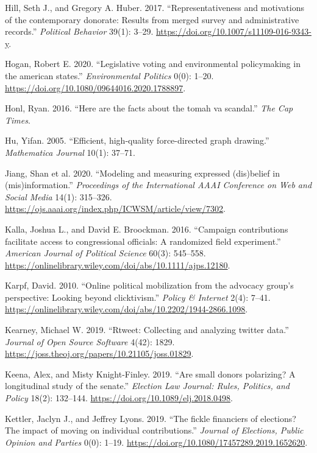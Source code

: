 \documentclass[12pt,]{article}
\begin{document}
\leavevmode\hypertarget{ref-hill2017}{}%
Hill, Seth J., and Gregory A. Huber. 2017. ``Representativeness and
motivations of the contemporary donorate: Results from merged survey and
administrative records.'' \emph{Political Behavior} 39(1): 3--29.
\url{https://doi.org/10.1007/s11109-016-9343-y}.

\leavevmode\hypertarget{ref-hogan2020}{}%
Hogan, Robert E. 2020. ``Legislative voting and environmental
policymaking in the american states.'' \emph{Environmental Politics}
0(0): 1--20. \url{https://doi.org/10.1080/09644016.2020.1788897}.

\leavevmode\hypertarget{ref-honl2016}{}%
Honl, Ryan. 2016. ``Here are the facts about the tomah va scandal.''
\emph{The Cap Times}.

\leavevmode\hypertarget{ref-yifanhu}{}%
Hu, Yifan. 2005. ``Efficient, high-quality force-directed graph
drawing.'' \emph{Mathematica Journal} 10(1): 37--71.

\leavevmode\hypertarget{ref-jiang2020}{}%
Jiang, Shan et al. 2020. ``Modeling and measuring expressed (dis)belief
in (mis)information.'' \emph{Proceedings of the International AAAI
Conference on Web and Social Media} 14(1): 315--326.
\url{https://ojs.aaai.org/index.php/ICWSM/article/view/7302}.

\leavevmode\hypertarget{ref-kalla2016}{}%
Kalla, Joshua L., and David E. Broockman. 2016. ``Campaign contributions
facilitate access to congressional officials: A randomized field
experiment.'' \emph{American Journal of Political Science} 60(3):
545--558.
\url{https://onlinelibrary.wiley.com/doi/abs/10.1111/ajps.12180}.

\leavevmode\hypertarget{ref-karpf2010}{}%
Karpf, David. 2010. ``Online political mobilization from the advocacy
group's perspective: Looking beyond clicktivism.'' \emph{Policy \&
Internet} 2(4): 7--41.
\url{https://onlinelibrary.wiley.com/doi/abs/10.2202/1944-2866.1098}.

\leavevmode\hypertarget{ref-rtweet}{}%
Kearney, Michael W. 2019. ``Rtweet: Collecting and analyzing twitter
data.'' \emph{Journal of Open Source Software} 4(42): 1829.
\url{https://joss.theoj.org/papers/10.21105/joss.01829}.

\leavevmode\hypertarget{ref-keena2019}{}%
Keena, Alex, and Misty Knight-Finley. 2019. ``Are small donors
polarizing? A longitudinal study of the senate.'' \emph{Election Law
Journal: Rules, Politics, and Policy} 18(2): 132--144.
\url{https://doi.org/10.1089/elj.2018.0498}.

\leavevmode\hypertarget{ref-kettler2019}{}%
Kettler, Jaclyn J., and Jeffrey Lyons. 2019. ``The fickle financiers of
elections? The impact of moving on individual contributions.''
\emph{Journal of Elections, Public Opinion and Parties} 0(0): 1--19.
\url{https://doi.org/10.1080/17457289.2019.1652620}.
\end{document}
